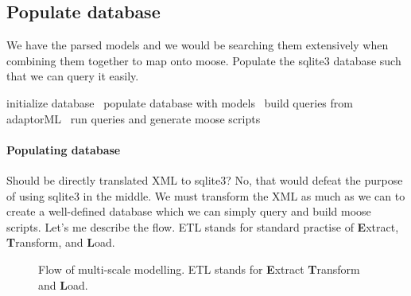 \documentclass[]{article}%
\begin{document}
\subsection{Populate database}

    We have the parsed models and we would be searching them extensively when
    combining them together to map onto moose. Populate the sqlite3 database
    such that we can query it easily.

\nwenddocs{}\endmoddef\nwstartdeflinemarkup{}\nwenddeflinemarkup
\LA{}initialize database~{\nwtagstyle{}}\RA{}
\LA{}populate database with models~{\nwtagstyle{}}\RA{}
\LA{}build queries from adaptorML~{\nwtagstyle{}}\RA{}
\LA{}run queries and generate moose scripts~{\nwtagstyle{}}\RA{}
\eatline
{}\nwendcode{}\nwdocspar
\paragraph{Populating database}

    Should be directly translated XML to {\Tt{}sqlite3\nwendquote}? No, that would defeat the
    purpose of using sqlite3 in the middle. We must transform the XML as much as
    we can to create a well-defined database which we can simply query and build
    moose scripts. Let's me describe the flow. ETL stands for standard practise
    of \textbf{E}xtract, \textbf{T}ransform, and \textbf{L}oad.

\begin{figure}[h]
\centering
{}
\label{fig:multiscale_flow}
\caption{Flow of multi-scale modelling. ETL stands for \textbf{E}xtract
\textbf{T}ransform and \textbf{L}oad.}
\end{figure}
\end{document}
